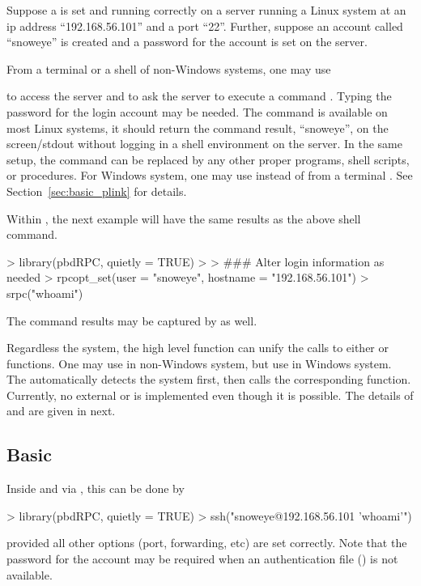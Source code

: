 Suppose a  is set and running correctly on a server running a Linux
system at an ip address ``192.168.56.101'' and a port ``22''.
Further, suppose an account
called ``snoweye'' is created and a password for the account is set on
the server.

From a terminal or a shell of non-Windows systems, one may use
to access the server and to ask the server to execute a command .
Typing the password for the login account may be needed.
The command  is available on most Linux systems, it should
return the command result, ``snoweye'', on the screen/stdout without
logging in a shell environment on the server.
In the same setup, the command  can be replaced
by any other proper programs, shell scripts, or procedures.
For Windows system, one may use  instead of 
from a terminal . See Section~\ref{sec:basic_plink} for details.

Within , the next example will have the
same results as the above shell command.
\begin{Code}[title=Basic \code{srpc()} in \pkg{pbdRPC} and \proglang{R}]
> library(pbdRPC, quietly = TRUE)
>
> ### Alter login information as needed
> rpcopt_set(user = "snoweye", hostname = "192.168.56.101")
> srpc("whoami")
\end{Code}
The command results may be captured by  as well.

Regardless the system,
the high level function  can unify the calls to
either  or  functions.
One may use  in non-Windows system, but
use  in Windows system.
The  automatically
detects the system first, then calls the corresponding function.
Currently, no external  or  is implemented
even though it is possible.
The details of  and  are given in next.


\subsection[Basic \code{ssh()}]{Basic }
\label{sec:basic_ssh}

Inside  and via , this can be done by
\begin{Code}[title=Basic \code{ssh()} in \pkg{pbdRPC} and \proglang{R}]
> library(pbdRPC, quietly = TRUE)
> ssh("snoweye@192.168.56.101 'whoami'")
\end{Code}
provided all other options (port, forwarding, etc) are set correctly.
Note that the password for the account may be required when an
authentication file () is not available.

